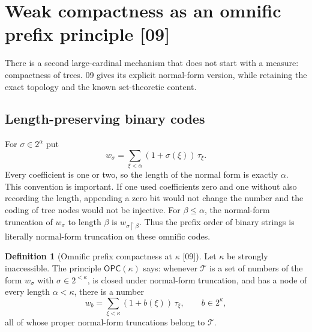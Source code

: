 \documentclass[11pt,letterpaper]{article}
\numberwithin{equation}{section}
\theoremstyle{definition}
\newtheorem{definition}[theorem]{Definition}
\theoremstyle{remark}
\newcommand{\res}{\mathbin{\upharpoonright}}
\newcommand{\src}[1]{\textup{\textsf{\small[#1]}}}%
\newcommand{\OPC}{\mathsf{OPC}}
\begin{document}
\section{Weak compactness as an omnific prefix principle \src{09}}\label{lce:sg:sec:weak}

There is a second large-cardinal mechanism that does not start with a
measure: compactness of trees. 09 gives its explicit normal-form version,
while retaining the exact topology and the known set-theoretic content.

\subsection{Length-preserving binary codes}
For $\sigma\in2^\alpha$ put
\begin{equation}\label{lce:sg:eq:prefix-code}
 w_\sigma=\sum_{\xi<\alpha}(1+\sigma(\xi))\,\tau_\xi.
\end{equation}
Every coefficient is one or two, so the length of the normal form is
exactly $\alpha$. This convention is important. If one used coefficients
zero and one without also recording the length, appending a zero bit would
not change the number and the coding of tree nodes would not be injective.
For $\beta\le\alpha$, the normal-form truncation of $w_\sigma$ to length
$\beta$ is $w_{\sigma\res\beta}$. Thus the prefix order of binary strings is
literally normal-form truncation on these omnific codes.

\begin{definition}[Omnific prefix compactness at $\kappa$ \src{09}]
Let $\kappa$ be strongly inaccessible. The principle $\OPC(\kappa)$ says:
whenever $\mathcal T$ is a set of numbers of the form $w_\sigma$ with
$\sigma\in2^{<\kappa}$, is closed under normal-form truncation, and has a
node of every length $\alpha<\kappa$, there is a number
\[
 w_b=\sum_{\xi<\kappa}(1+b(\xi))\,\tau_\xi,
 \qquad b\in2^\kappa,
\]
all of whose proper normal-form truncations belong to $\mathcal T$.
\end{definition}
\end{document}
